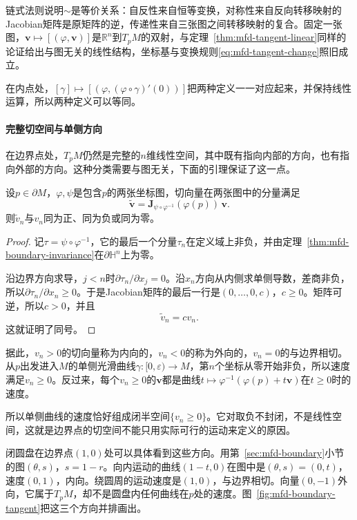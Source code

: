 链式法则说明$\sim$是等价关系：自反性来自恒等变换，对称性来自反向转移映射的Jacobian矩阵是原矩阵的逆，传递性来自三张图之间转移映射的复合。固定一张图，$\bm v\mapsto[(\varphi,\bm v)]$是$\mathbb R^n$到$T_pM$的双射，与定理~\ref{thm:mfd-tangent-linear}同样的论证给出与图无关的线性结构，坐标基与变换规则\eqref{eq:mfd-tangent-change}照旧成立。

在内点处，$[\gamma]\mapsto[(\varphi,(\varphi\circ\gamma)'(0))]$把两种定义一一对应起来，并保持线性运算，所以两种定义可以等同。

\paragraph{完整切空间与单侧方向}
在边界点处，$T_pM$仍然是完整的$n$维线性空间，其中既有指向内部的方向，也有指向外部的方向。这种分类需要与图无关，下面的引理保证了这一点。

\begin{lemma}[内向与外向的坐标无关性]
\label{lem:mfd-inward-outward}
设$p\in\partial M$，$\varphi,\psi$是包含$p$的两张坐标图，切向量在两张图中的分量满足
\begin{equation}
\tilde{\bm v}=\bm J_{\psi\circ\varphi^{-1}}(\varphi(p))\,\bm v .
\label{eq:mfd-inward-record}
\end{equation}
则$\tilde v_n$与$v_n$同为正、同为负或同为零。
\end{lemma}

\begin{proof}
记$\tau=\psi\circ\varphi^{-1}$，它的最后一个分量$\tau_n$在定义域上非负，并由定理~\ref{thm:mfd-boundary-invariance}在$\partial\mathbb H^n$上为零。

沿边界方向求导，$j<n$时$\partial\tau_n/\partial x_j=0$。沿$x_n$方向从内侧求单侧导数，差商非负，所以$\partial\tau_n/\partial x_n\geq0$。于是Jacobian矩阵的最后一行是$(0,\ldots,0,c)$，$c\geq0$。矩阵可逆，所以$c>0$，并且
\[
\tilde v_n=cv_n .
\]
这就证明了同号。
\end{proof}

据此，$v_n>0$的切向量称为内向的，$v_n<0$的称为外向的，$v_n=0$的与边界相切。从$p$出发进入$M$的单侧光滑曲线$\gamma:[0,\varepsilon)\to M$，第$n$个坐标从零开始非负，所以速度满足$v_n\geq0$。反过来，每个$v_n\geq0$的$\bm v$都是曲线$t\mapsto\varphi^{-1}(\varphi(p)+t\bm v)$在$t\geq0$时的速度。

所以单侧曲线的速度恰好组成闭半空间$\{v_n\geq0\}$。它对取负不封闭，不是线性空间，这就是边界点的切空间不能只用实际可行的运动来定义的原因。

闭圆盘在边界点$(1,0)$处可以具体看到这些方向。用第~\ref{sec:mfd-boundary}小节的图$(\theta,s)$，$s=1-r$。向内运动的曲线$(1-t,0)$在图中是$(\theta,s)=(0,t)$，速度$(0,1)$，内向。绕圆周的运动速度是$(1,0)$，与边界相切。向量$(0,-1)$外向，它属于$T_pM$，却不是圆盘内任何曲线在$p$处的速度。图~\ref{fig:mfd-boundary-tangent}把这三个方向并排画出。

